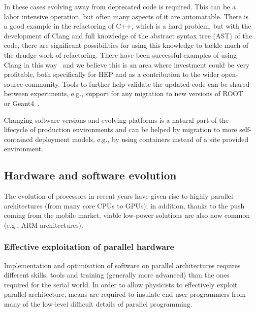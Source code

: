 \documentclass[12pt,a4paper]{article}
\begin{document}
In these cases evolving away from deprecated code is required. This can
be a labor intensive operation, but often many aspects of it are
automatable. There is a good example in the refactoring of C++, which is
a hard problem, but with the development of Clang and full knowledge of
the abstract syntax tree (AST) of the code, there are significant
possibilities for using this knowledge to tackle much of the drudge work
of refactoring. There have been successful examples of using Clang in
this way~\cite{ClangMR41342}
and we believe this is an area where investment could be very profitable,
both specifically for HEP and as a contribution to the wider open-source
community. Tools to further help validate the updated code can be shared
between experiments, e.g., support for any migration to new versions of
ROOT~\cite{Brun1996} or Geant4~\cite{Agostinelli2003}.

Changing software versions and evolving platforms is a natural part of
the lifecycle of production environments and can be helped by migration
to more self-contained deployment models, e.g., by using containers
instead of a site provided environment.

\hypertarget{hardware-and-software-evolution}{%
\subsection{Hardware and software
evolution}\label{hardware-and-software-evolution}}

The evolution of processors in recent years have given rise to highly
parallel architectures (from many core CPUs to GPUs); in addition,
thanks to the push coming from the mobile market, viable low-power
solutions are also now common (e.g., ARM architectures).

\hypertarget{effective-exploitation-of-parallel-hardware}{%
\subsubsection{Effective exploitation of parallel
hardware}\label{effective-exploitation-of-parallel-hardware}}

Implementation and optimisation of software on parallel architectures
requires different skills, tools and training (generally more advanced)
than the ones required for the serial world. In order to allow
physicists to effectively exploit parallel architecture, means are
required to insulate end user programmers from many of the low-level
difficult details of parallel programming.
\end{document}
